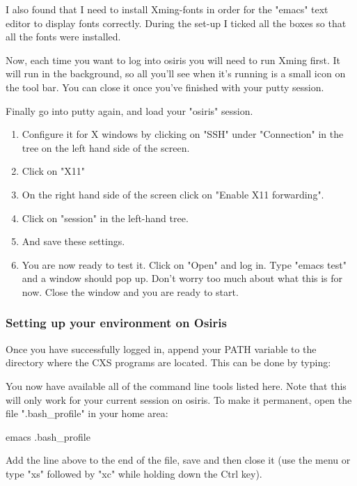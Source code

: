 \documentclass[]{cxs-software}
\begin{document}
I also found that I need to install Xming-fonts in order for the
"emacs" text editor to display fonts correctly. During the set-up I
ticked all the boxes so that all the fonts were installed.

Now, each time you want to log into osiris you will need to run Xming
first. It will run in the background, so all you'll see when it's
running is a small icon on the tool bar. You can close it once you've
finished with your putty session.

Finally go into putty again, and load your "osiris" session. 
\begin{enumerate}
\item Configure it for X windows by clicking on "SSH" under "Connection" in the tree on the left hand side of the screen. 
\item Click on "X11" 
\item On the right hand side of the screen click on "Enable X11 forwarding". 
\item Click on "session" in the left-hand tree. 
\item And save these settings. 
\item You are now ready to test it. Click on "Open" and log in. Type
  "emacs test" and a window should pop up. Don't worry too much about
  what this is for now. Close the window and you are ready to start.
\end{enumerate}

\subsubsection{Setting up your environment on Osiris}
\label{osiris-setup}
Once you have successfully logged in, append your PATH variable to the
directory where the CXS programs are located. This can be done by
typing:

You now have available all of the command line tools listed here. Note
that this will only work for your current session on osiris. To make
it permanent, open the file ".bash\_profile" in your home area:
\begin{myverbatim}
  emacs .bash_profile 
\end{myverbatim}
Add the line above to the end of the file, save and then close it (use
the menu or type "xs" followed by "xc" while holding down the Ctrl
key).
\end{document}
